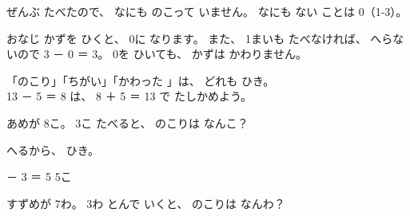 \noindent\begin{minipage}[c]{0.44\linewidth}\centering
{}
\end{minipage}\hfill
\begin{minipage}[c]{0.54\linewidth}
ぜんぶ たべたので、 なにも のこって いません。 なにも ない ことは 0（1-3）。
\end{minipage}
\noindent おなじ かずを ひくと、 0に なります。 また、 1まいも たべなければ、 へらないので 3 － 0 ＝ 3。 0を ひいても、 かずは かわりません。

\begin{taisetsu}
「のこり」「ちがい」「かわった 」は、 どれも ひき。\\
13 － 5 ＝ 8 は、 8 ＋ 5 ＝ 13 で たしかめよう。
\end{taisetsu}


\begin{reidai}[のこり]
あめが 8こ。 3こ たべると、 のこりは なんこ？

\noindent\begin{minipage}[c]{0.66\linewidth}
\kangaekata へるから、 ひき。

 － 3 ＝ 5 \kotaenext 5こ
\end{minipage}\hfill
\begin{minipage}[c]{0.32\linewidth}\centering
{}
\end{minipage}
\end{reidai}

\begin{jibun}
すずめが 7わ。 3わ とんで いくと、 のこりは なんわ？
\bkshikiran
{}
\end{jibun}

